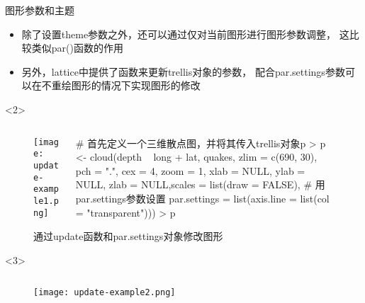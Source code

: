 \begin{frame}[t,fragile]{\subsecname}{图形参数和主题}
\begin{itemize}
\item 除了设置theme参数之外，还可以通过仅对当前图形进行图形参数调整，
这比较类似par()函数的作用
\item 另外，lattice中提供了函数来更新trellis对象的参数，
配合par.settings参数可以在不重绘图形的情况下实现图形的修改
\end{itemize}

\begin{overlayarea}{\textwidth}{\textheight}
\begin{onlyenv}<2>
\begin{figure}
 \begin{columns}
    \begin{column}[c]{.4\textwidth}
        \texttt{[image: update-example1.png]}
    \end{column}

    \begin{column}[c]{.6\textwidth}
\begin{rcode}
# 首先定义一个三维散点图，并将其传入trellis对象p
> p <-
  cloud(depth ~ long + lat, quakes, zlim = c(690, 30), pch = ".", cex = 4, zoom = 1, xlab = NULL, ylab = NULL, zlab = NULL,scales = list(draw = FALSE),
        # 用par.settings参数设置 
        par.settings = list(axis.line = list(col = "transparent")))
> p
\end{rcode}
    \end{column}
  \end{columns}
  \caption{通过update函数和par.settings对象修改图形}
\end{figure}
\end{onlyenv}

\begin{onlyenv}<3>
\begin{figure}
 \begin{columns}
    \begin{column}[c]{.4\textwidth}
        \texttt{[image: update-example2.png]}
    \end{column}


\end{columns}
\end{figure}
\end{onlyenv}
\end{overlayarea}
\end{frame}
